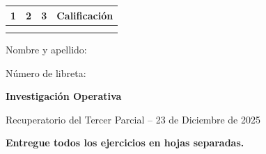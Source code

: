 \documentclass[a4paper,oneside,12pt]{amsart}
\newcommand{\nombremateria}
{Investigaci\'on Operativa}
\newcommand{\numeroparcial}
    { Recuperatorio del Tercer Parcial }
\newcommand{\fecha}
    {23 de Diciembre de 2025}
\theoremstyle{definition}
\begin{document}
\hfill \hfill
\begin{tabular}[c]{|c|c|c|c|}
\hline 
1 & 2 & 3 & Calificaci\'on \\ \hline \hline
\hspace{1.2 cm} & \hspace{1.2 cm} & \hspace{1.2 cm} &\hspace{1.5 cm} \\
\hspace{1.2 cm} & \hspace{1.2 cm} & \hspace{1.2 cm} &\hspace{1.5 cm} \\ \hline

\end{tabular}

\vspace{-1cm}

\noindent Nombre y apellido:

\vspace{0.2cm}

\noindent Número de libreta:

\noindent \hrulefill 

\smallskip
\renewcommand{\baselinestretch}{1.1}

\begin{center}
	\large \textbf{\nombremateria} 
	
	\numeroparcial -- \fecha
\end{center}

\begin{center}
\textbf{Entregue todos los ejercicios en hojas separadas.}
\end{center}

\vspace{.6cm}
\renewcommand{\theenumi}{\textbf{\arabic{enumi}}}

\end{document}
